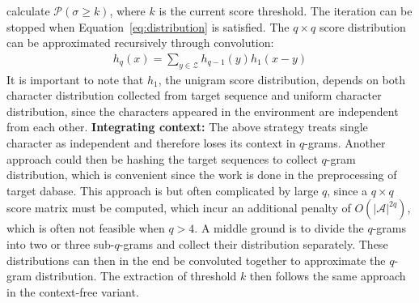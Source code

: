 \documentclass[twoside,a4paper,bsc]{master}
\newcommand{\Qgram}[1]{\(#1\)-gram}
\begin{document}
calculate \(\mathcal{P}(\sigma \geq k)\), where \(k\) is the current score
threshold. The iteration can be stopped when Equation~\ref{eq:distribution}
is satisfied.
The \(q\times q\) score distribution can be approximated recursively
through convolution:
\begin{align}
h_{q}(x) = \sum_{y\in\mathcal{Z}} h_{q-1}(y)h_1(x-y)
\label{equation:convolution}
\end{align}
It is important to note that \(h_1\), the unigram score distribution,
depends on both character distribution collected from target sequence and
uniform character distribution, since the characters appeared in the
environment are independent from each other.
\textbf{Integrating context:} The above strategy treats single character as
independent and therefore loses its context in \Qgram{q}s. Another
approach could then be hashing the target sequences to collect \Qgram{q}
distribution, which is convenient since the work is done in the
preprocessing of target dabase. This approach is but often complicated by
large \(q\), since a \(q\times q\) score matrix must be computed, which
incur an additional penalty of \(O(|\mathcal{A}|^{2q})\), which is often
not feasible when \(q>4\). A middle ground is to divide the \Qgram{q}s
into two or three sub-\Qgram{q}s and collect their distribution
separately. These distributions can then in the end be convoluted together
to approximate the \Qgram{q} distribution. The extraction of threshold
\(k\) then follows the same approach in the context-free variant.
\end{document}
